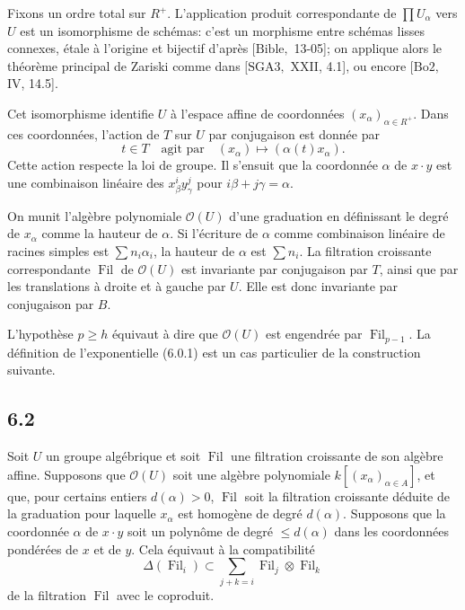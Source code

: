 \documentclass[11pt]{article}
\providecommand{\Fil}{\operatorname{Fil}}
\providecommand{\OO}{\mathcal O}
\begin{document}
Fixons un ordre total sur \(R^+\). L'application produit correspondante de
\(\prod U_\alpha\) vers \(U\) est un isomorphisme de schémas: c'est un morphisme entre
schémas lisses connexes, étale à l'origine et bijectif d'après \([\mathrm{Bible},\) 13-05];
on applique alors le théorème principal de Zariski comme dans \([\mathrm{SGA3},\) XXII,
4.1], ou encore \([\mathrm{Bo2},\) IV, 14.5].

Cet isomorphisme identifie \(U\) à l'espace affine de coordonnées
\((x_\alpha)_{\alpha\in R^+}\). Dans ces coordonnées, l'action de \(T\) sur \(U\) par
conjugaison est donnée par
\[
  t\in T\quad\text{agit par}\quad (x_\alpha)\longmapsto(\alpha(t)x_\alpha).
\]
Cette action respecte la loi de groupe. Il s'ensuit que la coordonnée \(\alpha\) de
\(x\cdot y\) est une combinaison linéaire des \(x_\beta^i y_\gamma^j\) pour
\(i\beta+j\gamma=\alpha\).

On munit l'algèbre polynomiale \(\mathcal O(U)\) d'une graduation en définissant le degré
de \(x_\alpha\) comme la hauteur de \(\alpha\). Si l'écriture de \(\alpha\) comme
combinaison linéaire de racines simples est \(\sum n_i\alpha_i\), la hauteur de \(\alpha\)
est \(\sum n_i\). La filtration croissante correspondante \(\Fil\) de \(\mathcal O(U)\)
est invariante par conjugaison par \(T\), ainsi que par les translations à droite et à
gauche par \(U\). Elle est donc invariante par conjugaison par \(B\).

L'hypothèse \(p\ge h\) équivaut à dire que \(\mathcal O(U)\) est engendrée par
\(\Fil_{p-1}\). La définition de l'exponentielle (6.0.1) est un cas particulier de la
construction suivante.


\subsection*{6.2}
Soit \(U\) un groupe algébrique et soit \(\Fil\) une filtration croissante de son algèbre affine. Supposons
que \(\OO(U)\) soit une algèbre polynomiale \(k[(x_\alpha)_{\alpha\in A}]\), et que, pour certains entiers
\(d(\alpha)>0\), \(\Fil\) soit la filtration croissante déduite de la graduation pour laquelle
\(x_\alpha\) est homogène de degré \(d(\alpha)\). Supposons que la coordonnée \(\alpha\) de
\(x\cdot y\) soit un polynôme de degré \(\le d(\alpha)\) dans les coordonnées pondérées de \(x\)
et de \(y\). Cela équivaut à la compatibilité
\begin{equation}
  \Delta(\Fil_i)\subset \sum_{j+k=i}\Fil_j\otimes\Fil_k
  \tag{6.2.1}
\end{equation}
de la filtration \(\Fil\) avec le coproduit.
\end{document}
